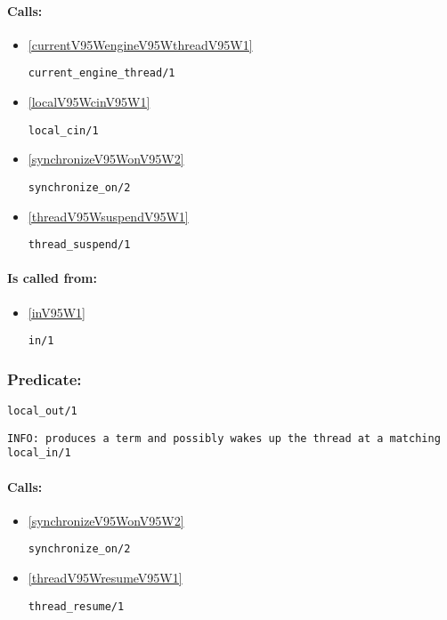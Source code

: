 \paragraph{Calls:} 
\begin{itemize}
\item \ref{currentV95WengineV95WthreadV95W1} 
\begin{verbatim}
current_engine_thread/1
\end{verbatim}

\item \ref{localV95WcinV95W1} 
\begin{verbatim}
local_cin/1
\end{verbatim}

\item \ref{synchronizeV95WonV95W2} 
\begin{verbatim}
synchronize_on/2
\end{verbatim}

\item \ref{threadV95WsuspendV95W1} 
\begin{verbatim}
thread_suspend/1
\end{verbatim}

\end{itemize}
\paragraph{Is called from:} 
\begin{itemize}
\item \ref{inV95W1} 
\begin{verbatim}
in/1
\end{verbatim}

\end{itemize}

\subsubsection{Predicate:} \label{localV95WoutV95W1}

\begin{verbatim}
local_out/1
\end{verbatim}

{\small \begin{verbatim}
INFO: produces a term and possibly wakes up the thread at a matching local_in/1

\end{verbatim}}
\paragraph{Calls:} 
\begin{itemize}
\item \ref{synchronizeV95WonV95W2} 
\begin{verbatim}
synchronize_on/2
\end{verbatim}

\item \ref{threadV95WresumeV95W1} 
\begin{verbatim}
thread_resume/1
\end{verbatim}

\end{itemize}
